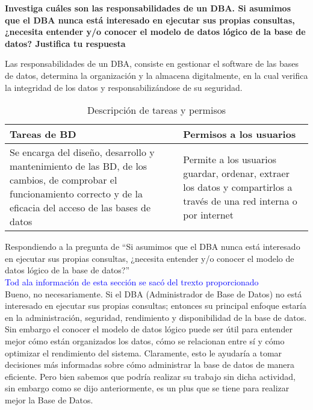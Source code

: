 \begin{center}   
\textbf{Investiga cuáles son las responsabilidades de un DBA. Si asumimos que el DBA nunca está
interesado en ejecutar sus propias consultas, ¿necesita entender y/o conocer el modelo de datos
lógico de la base de datos? Justifica tu respuesta} \\
\end{center}

Las responsabilidades de un DBA, consiste en gestionar el software de las bases de datos, determina la organización y la almacena digitalmente, en la cual verifica la integridad de los datos y responsabilizándose de su seguridad.


\begin{table}[h]
\centering
\begin{tabular}{|p{6cm}|p{6cm}|}
\hline
\textbf{Tareas de BD} & \textbf{Permisos a los usuarios} \\
\hline
Se encarga del diseño, desarrollo y mantenimiento de las BD, de los cambios, de comprobar el funcionamiento correcto y de la eficacia del acceso de las bases de datos & Permite a los usuarios guardar, ordenar, extraer los datos y compartirlos a través de una red interna o por internet \\
\hline
\end{tabular}
\caption{Descripción de tareas y permisos}
\end{table}

Respondiendo a la pregunta de \textquotedblleft Si asumimos que el DBA
nunca está interesado en ejecutar sus propias consultas, ¿necesita entender y/o conocer el modelo de datos lógico de la base de datos?\textquotedblright
\\
\textcolor{blue}{Tod ala información de esta sección se sacó del trexto proporcionado\cite{Barcelona-Activa}} \\


Bueno, no necesariamente. Si el DBA (Administrador de Base de Datos) no está interesado en ejecutar sus propias consultas; entonces su principal enfoque estaría en la administración, seguridad, rendimiento y disponibilidad de la base de datos. Sin embargo el conocer el modelo de datos lógico puede ser útil para entender mejor cómo están organizados los datos, cómo se relacionan entre sí y cómo optimizar el rendimiento del sistema. Claramente, esto le ayudaría a tomar decisiones más informadas sobre cómo administrar la base de datos de manera eficiente. Pero bien sabemos que podría realizar su trabajo sin dicha actividad, sin embargo como se dijo anteriormente, es un plus que se tiene para realizar mejor la Base de Datos. \\
